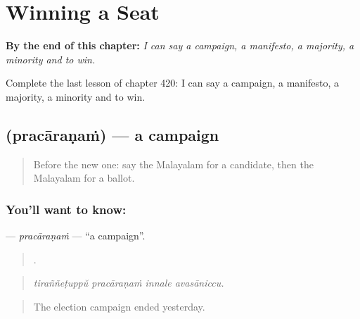 
\chapter{Winning a Seat}
\label{ch:ml-winning-a-seat}

\begin{chapteropening}
\textbf{By the end of this chapter:} \emph{I can say a campaign, a manifesto, a majority, a minority and to win.}

Complete the last lesson of chapter 420: I can say a campaign, a manifesto, a majority, a minority and to win.
\end{chapteropening}

\section[\texorpdfstring{\ml{പ്രചാരണം} (pracāraṇaṁ)}{പ്രചാരണം (pracāraṇaṁ)}]{ (pracāraṇaṁ) — a campaign}

\label{lesson:ML-C420-pracaranam}



\begin{quote}
Before the new one: say the Malayalam for a candidate, then the Malayalam for a ballot.
\end{quote}

\subsection*{You'll want to know: }
\textbf{} — \emph{pracāraṇaṁ} — \textquotedblleft{}a campaign\textquotedblright{}.

\begin{quote}
   .
\end{quote}

\begin{quote}
\emph{tiraññeṭuppŭ pracāraṇaṁ innale avasāniccu.}
\end{quote}

\begin{quote}
The election campaign ended yesterday.
\end{quote}

